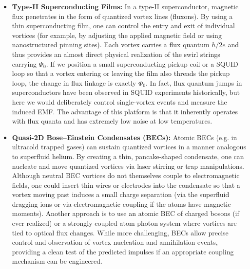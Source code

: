 \documentclass[12pt]{article}
\begin{document}
\begin{itemize}

\item 
\textbf{Type-II Superconducting Films:} In a type-II superconductor, magnetic flux penetrates in the form of quantized vortex lines (fluxons). By using a thin superconducting film, one can control the entry and exit of individual vortices (for example, by adjusting the applied magnetic field or using nanostructured pinning sites). Each vortex carries a flux quantum $h/2e$ and thus provides an almost direct physical realization of the swirl strings carrying $\Phi_{0}$. If we position a small superconducting pickup coil or a SQUID loop so that a vortex entering or leaving the film also threads the pickup loop, the change in flux linkage is exactly $\Phi_{0}$. In fact, flux quantum jumps in superconductors have been observed in SQUID experiments historically, but here we would deliberately control single-vortex events and measure the induced EMF. The advantage of this platform is that it inherently operates with flux quanta and has extremely low noise at low temperatures.




\item 
\textbf{Quasi-2D Bose–Einstein Condensates (BECs):} Atomic BECs (e.g. in ultracold trapped gases) can sustain quantized vortices in a manner analogous to superfluid helium. By creating a thin, pancake-shaped condensate, one can nucleate and move quantized vortices via laser stirring or trap manipulations. Although neutral BEC vortices do not themselves couple to electromagnetic fields, one could insert thin wires or electrodes into the condensate so that a vortex moving past induces a small charge separation (via the superfluid dragging ions or via electromagnetic coupling if the atoms have magnetic moments). Another approach is to use an atomic BEC of charged bosons (if ever realized) or a strongly coupled atom-photon system where vortices are tied to optical flux changes. While more challenging, BECs allow precise control and observation of vortex nucleation and annihilation events, providing a clean test of the predicted impulses if an appropriate coupling mechanism can be engineered.





\end{itemize}
\end{document}

